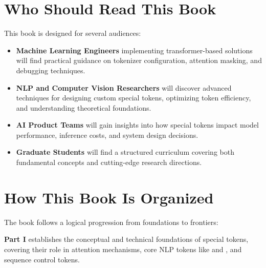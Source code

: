 \section*{Who Should Read This Book}

This book is designed for several audiences:

\begin{itemize}[leftmargin=*]
\item \textbf{Machine Learning Engineers} implementing transformer-based solutions will find practical guidance on tokenizer configuration, attention masking, and debugging techniques.

\item \textbf{NLP and Computer Vision Researchers} will discover advanced techniques for designing custom special tokens, optimizing token efficiency, and understanding theoretical foundations.

\item \textbf{AI Product Teams} will gain insights into how special tokens impact model performance, inference costs, and system design decisions.

\item \textbf{Graduate Students} will find a structured curriculum covering both fundamental concepts and cutting-edge research directions.
\end{itemize}
\begin{comment}
Feedback: This section is clear, but a little boilerplate. To make it more compelling, you could frame each point around a problem that audience faces. For example, for ML Engineers: "For Machine Learning Engineers struggling with tokenizer errors or mysterious performance drops, this book provides practical guidance..." For Researchers: "For Researchers looking to move beyond existing architectures, this book will...". This connects the book's content directly to the reader's pain points.
\end{comment}

\section*{How This Book Is Organized}

The book follows a logical progression from foundations to frontiers:

\textbf{Part I} establishes the conceptual and technical foundations of special tokens, covering their role in attention mechanisms, core NLP tokens like \cls{} and \mask{}, and sequence control tokens.

